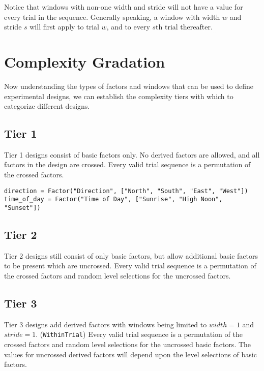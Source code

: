 Notice that windows with non-one width and stride will not have a value for every trial in the sequence. Generally speaking, a window with width $w$ and stride $s$ will first apply to trial $w$, and to every $s$th trial thereafter.



\section{Complexity Gradation}

Now understanding the types of factors and windows that can be used to define experimental designs, we can establish the complexity tiers with which to categorize different designs.

\subsection{Tier 1}

Tier 1 designs consist of basic factors only. No derived factors are allowed, and all factors in the design are crossed. Every valid trial sequence is a permutation of the crossed factors.

\begin{verbatim}
direction = Factor("Direction", ["North", "South", "East", "West"])
time_of_day = Factor("Time of Day", ["Sunrise", "High Noon", "Sunset"])
\end{verbatim}

\subsection{Tier 2}

Tier 2 designs still consist of only basic factors, but allow additional basic factors to be present which are uncrossed. Every valid trial sequence is a permutation of the crossed factors and random level selections for the uncrossed factors.

\subsection{Tier 3}

Tier 3 designs add derived factors with windows being limited to $width=1$ and $stride=1$. (\texttt{WithinTrial}) Every valid trial sequence is a permutation of the crossed factors and random level selections for the uncrossed basic factors. The values for uncrossed derived factors will depend upon the level selections of basic factors.

